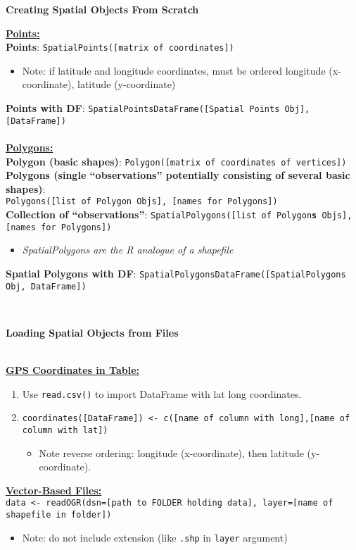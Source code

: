 \documentclass[10pt]{article}
\begin{document}
\centerline{\textbf{Creating Spatial Objects From Scratch}} 
\underline{\textbf{Points:}}\\
\textbf{Points}: \texttt{SpatialPoints([matrix of coordinates])}
\begin{itemize}
	\item Note: if latitude and longitude coordinates, must be ordered longitude (x-coordinate), latitude (y-coordinate)
\end{itemize}
\textbf{Points with DF}: \texttt{SpatialPointsDataFrame([Spatial Points Obj], [DataFrame])}\\
\\
\underline{\textbf{Polygons:}}\\
\textbf{Polygon (basic shapes)}: \texttt{Polygon([matrix of coordinates of vertices])}\\
\textbf{Polygons (single ``observations'' potentially consisting of several basic shapes)}:\\ 
\hspace*{1cm} \texttt{Polygons([list of Polygon Objs], [names for Polygons])}\\
\textbf{Collection of ``observations''}: \texttt{SpatialPolygons([list of Polygon\textbf{s} Objs], [names for Polygons])}
\begin{itemize}
	\item \emph{SpatialPolygons are the R analogue of a shapefile}
\end{itemize}
\textbf{Spatial Polygons with DF}: \texttt{SpatialPolygonsDataFrame([SpatialPolygons Obj, DataFrame])}



\hrulefill \\ 
\centerline{\textbf{Loading Spatial Objects from Files}} \\
\underline{\textbf{GPS Coordinates in Table:}}\\
\begin{enumerate}
	\item Use \texttt{read.csv()} to import DataFrame with lat long coordinates.
	\item \texttt{coordinates([DataFrame]) <- c([name of column with long],[name of column with lat])}
	\begin{itemize}
		\item Note reverse ordering: longitude (x-coordinate), then latitude (y-coordinate).
	\end{itemize}
\end{enumerate}
\underline{\textbf{Vector-Based Files:}}\\
\texttt{data <- readOGR(dsn=[path to FOLDER holding data], layer=[name of shapefile in folder])}
\begin{itemize}
	\item Note: do not include extension (like \texttt{.shp} in \texttt{layer} argument)
\end{itemize}
\end{document}
